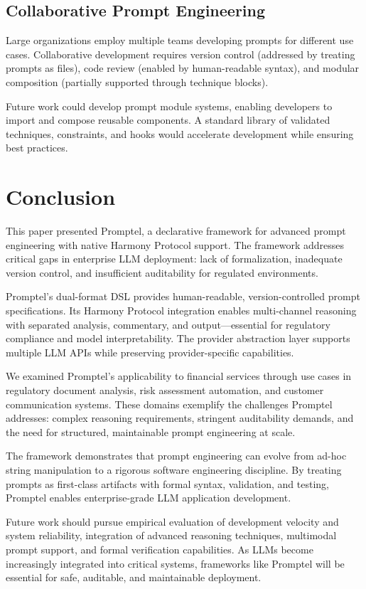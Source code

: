 \documentclass[11pt,a4paper]{article}
\begin{document}
\subsection{Collaborative Prompt Engineering}

Large organizations employ multiple teams developing prompts for different use cases. Collaborative development requires version control (addressed by treating prompts as files), code review (enabled by human-readable syntax), and modular composition (partially supported through technique blocks).

Future work could develop prompt module systems, enabling developers to import and compose reusable components. A standard library of validated techniques, constraints, and hooks would accelerate development while ensuring best practices.

\section{Conclusion}

This paper presented Promptel, a declarative framework for advanced prompt engineering with native Harmony Protocol support. The framework addresses critical gaps in enterprise LLM deployment: lack of formalization, inadequate version control, and insufficient auditability for regulated environments.

Promptel's dual-format DSL provides human-readable, version-controlled prompt specifications. Its Harmony Protocol integration enables multi-channel reasoning with separated analysis, commentary, and output—essential for regulatory compliance and model interpretability. The provider abstraction layer supports multiple LLM APIs while preserving provider-specific capabilities.

We examined Promptel's applicability to financial services through use cases in regulatory document analysis, risk assessment automation, and customer communication systems. These domains exemplify the challenges Promptel addresses: complex reasoning requirements, stringent auditability demands, and the need for structured, maintainable prompt engineering at scale.

The framework demonstrates that prompt engineering can evolve from ad-hoc string manipulation to a rigorous software engineering discipline. By treating prompts as first-class artifacts with formal syntax, validation, and testing, Promptel enables enterprise-grade LLM application development.

Future work should pursue empirical evaluation of development velocity and system reliability, integration of advanced reasoning techniques, multimodal prompt support, and formal verification capabilities. As LLMs become increasingly integrated into critical systems, frameworks like Promptel will be essential for safe, auditable, and maintainable deployment.
\end{document}
